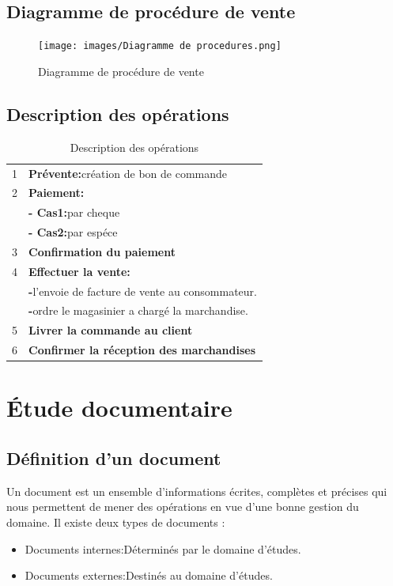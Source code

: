 \documentclass[edit,12pt,a4paper,ChapStyle,oneside,doubleinterligne]{report}
\begin{document}
\subsection{Diagramme de procédure de vente}
\begin{figure}[h!]\label{fig:procedures}
\centering
\texttt{[image: images/Diagramme de procedures.png]}
\caption{Diagramme de procédure de vente }
\end{figure}
\subsection{Description des opérations}
\begin{table}[h!]
    \centering
    \begin{tabular}{|c|l|}
        \hline
        1 & \textbf{Prévente:}création de bon de commande \\
        2 & \textbf{Paiement:} \\
          & \textbf{- Cas1:}par cheque \\
          & \textbf{- Cas2:}par espéce \\
        3 & \textbf{Confirmation du paiement} \\
        4 & \textbf{Effectuer la vente: } \\
          & \textbf{-}l’envoie de facture de vente au consommateur. \\
          & \textbf{-}ordre le magasinier a chargé la marchandise. \\
        5 & \textbf{Livrer la commande au client} \\
        6 & \textbf{Confirmer la réception des marchandises} \\
       \hline
    \end{tabular}
    \caption{Description des opérations}
    \label{tab:auxiliaire Description des opérations}
\end{table}
\section{Étude documentaire}
\subsection{Définition d’un document }
Un document est un ensemble d'informations écrites, complètes et précises qui nous permettent de mener des opérations en vue d'une bonne gestion du domaine. Il existe deux types de documents :
\begin{itemize}
    \item Documents internes:Déterminés par le domaine d'études.
    \item Documents externes:Destinés au domaine d'études.
\end{itemize}
\end{document}
